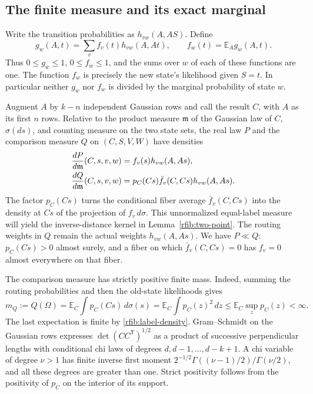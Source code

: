 \subsection{The finite measure and its exact marginal}

Write the transition probabilities as \(h_{vw}(A,AS)\).  Define
\begin{equation}\label{rfib:routing}
 g_w(A,t)=\sum_v f_v(t)h_{vw}(A,At),\qquad
 f_w(t)=\mathbb E_A g_w(A,t).
\end{equation}
Thus \(0\le g_w\le1\), \(0\le f_w\le1\), and the sums over \(w\) of
each of these functions are one.  The function \(f_w\) is precisely
the new state's likelihood given \(S=t\).  In particular neither
\(g_w\) nor \(f_w\) is divided by the marginal probability of state
\(w\).

Augment \(A\) by \(k-n\) independent Gaussian rows and call the
result \(C\), with \(A\) as its first \(n\) rows.  Relative to the
product measure \(\mathfrak m\) of the Gaussian law of \(C\),
\(\sigma(ds)\), and counting measure on the two state sets, the real law \(P\) and the comparison
measure \(Q\) on \((C,S,V,W)\) have densities
\begin{align}
 \frac{dP}{d\mathfrak m}(C,s,v,w)
   &=f_v(s)h_{vw}(A,As),\notag\\
 \frac{dQ}{d\mathfrak m}(C,s,v,w)
   &=p_C(Cs)\bar f_v(C,Cs)h_{vw}(A,As).
   \label{rfib:PQ}
\end{align}
The factor \(p_C(Cs)\) turns the conditional fiber average
\(\bar f_v(C,Cs)\) into the density at \(Cs\) of the projection of
\(f_v\,d\sigma\).  This unnormalized equal-label measure will yield the
inverse-distance kernel in Lemma~\ref{rfib:two-point}.
The routing weights in \(Q\) remain the actual weights
\(h_{vw}(A,As)\).  We have \(P\ll Q\): \(p_C(Cs)>0\) almost surely,
and a fiber on which \(\bar f_v(C,Cs)=0\) has \(f_v=0\) almost
everywhere on that fiber.

The comparison measure has strictly positive finite mass.  Indeed,
summing the routing probabilities and then the old-state likelihoods
gives
\[
 m_Q:=Q(\Omega)
 =\mathbb E_C\int p_C(Cs)\,d\sigma(s)
 =\mathbb E_C\int p_C(z)^2\,dz
 \le\mathbb E_C\sup_z p_C(z)<\infty.
\]
The last expectation is finite by \eqref{rfib:label-density}.
Gram--Schmidt on the Gaussian rows expresses
\(\det(CC^{\mathsf T})^{1/2}\) as a product of successive
perpendicular lengths with conditional chi laws of degrees
\(d,d-1,\ldots,d-k+1\).  A chi variable of degree \(\nu>1\) has
finite inverse first moment
\(2^{-1/2}\Gamma((\nu-1)/2)/\Gamma(\nu/2)\), and all these degrees
are greater than one.  Strict positivity follows from the positivity
of \(p_C\) on the interior of its support.

